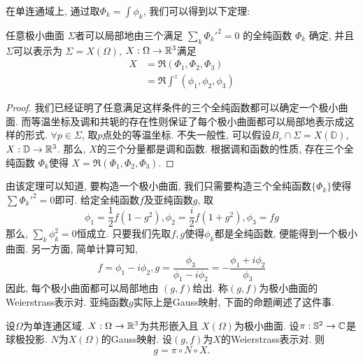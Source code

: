 在单连通域上, 通过取$\Phi_k = \int \phi_k$, 我们可以得到以下定理:
\begin{theorem}[Weierstrass表示]
    任意极小曲面 $\Sigma$者可以局部地由三个满足 $\sum_k \Phi_k'^2=0$ 的全纯函数 $\Phi_k$ 确定, 并且$\Sigma$可以表示为 $\Sigma=X(\Omega)$, $X: \Omega \to \R^3$满足 
    \begin{equation}
        \begin{split}
            X &=\Re (\Phi_1,\Phi_2,\Phi_3) \\
             &=\Re \int^z (\phi_1,\phi_2,\phi_3)
        \end{split}
    \end{equation}
\end{theorem}
\begin{proof}
    我们已经证明了任意满足这样条件的三个全纯函数都可以确定一个极小曲面. 而等温坐标及调和共轭的存在性则保证了每个极小曲面都可以局部地表示成这样的形式.  $\forall p \in \Sigma$, 取$p$点处的等温坐标. 不失一般性, 可以假设$B_r \cap \Sigma= X(\mathbb{D})$, $X: \mathbb{D} \to \R^3$. 那么, $X$的三个分量都是调和函数. 根据调和函数的性质, 存在三个全纯函数 $\Phi_k$使得  $X=\Re(\Phi_1,\Phi_2,\Phi_3)$.
\end{proof}
由该定理可以知道, 要构造一个极小曲面, 我们只需要构造三个全纯函数$\{\Phi_k\}$使得 $\sum \Phi_k'^2=0$即可. 给定全纯函数$f$及亚纯函数$g$, 取
\begin{equation}
    \phi_1=\frac{1}{2}f(1-g^2), \phi_2=\frac{i}{2} f(1+g^2), \phi_3=fg
\end{equation}
那么, $\sum_k \phi_k^2=0$恒成立. 只要我们先取$f,g$使得$\phi_k$都是全纯函数, 便能得到一个极小曲面. 另一方面, 简单计算可知, 
\begin{equation}
    f=\phi_1-i\phi_2, g=\frac{\phi_3}{\phi_1-i\phi_2}= -\frac{\phi_1+i\phi_2}{\phi_3}
\end{equation}
因此, 每个极小曲面都可以局部地由 $(g,f)$给出. 称$(g,f)$为极小曲面的Weierstrass表示对. 亚纯函数$g$实际上是Gauss映射, 下面的命题阐述了这件事.
\begin{proposition}
    设$\Omega$为单连通区域.  $X: \Omega \to \R^3$为共形嵌入且 $X(\Omega)$为极小曲面. 设$\pi: \S^2 \to \mathbb{C}$是球极投影. $N$为$X(\Omega)$的Gauss映射. 设$(g,f)$为$X$的Weierstrass表示对. 则
    \begin{equation}
        g=\pi\circ N  \circ X.
    \end{equation}
\end{proposition}

